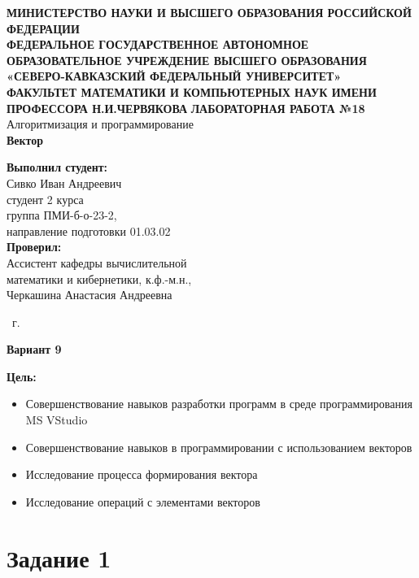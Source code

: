 \documentclass[14pt,a4paper]{article}
\begin{document}
\begin{titlepage}
  \begin{center}
    {\large\scshape\bfseries
    МИНИСТЕРСТВО НАУКИ И ВЫСШЕГО ОБРАЗОВАНИЯ РОССИЙСКОЙ ФЕДЕРАЦИИ\\
    ФЕДЕРАЛЬНОЕ ГОСУДАРСТВЕННОЕ АВТОНОМНОЕ ОБРАЗОВАТЕЛЬНОЕ УЧРЕЖДЕНИЕ ВЫСШЕГО
    ОБРАЗОВАНИЯ\\
    «СЕВЕРО-КАВКАЗСКИЙ ФЕДЕРАЛЬНЫЙ УНИВЕРСИТЕТ»\\
    ФАКУЛЬТЕТ МАТЕМАТИКИ И КОМПЬЮТЕРНЫХ НАУК ИМЕНИ ПРОФЕССОРА Н.И.ЧЕРВЯКОВА}
    \vfill
    \Large{\textbf{ЛАБОРАТОРНАЯ РАБОТА №18}}\\[2mm]
    \large{Алгоритмизация и программирование}\\[6mm]
    \large{\textbf{Вектор}}\\[20mm]
  \end{center}
  \begin{flushright}
    \large{
      \textbf{Выполнил студент:}\\
      Сивко Иван Андреевич\\
      студент 2 курса\\
      группа ПМИ-б-о-23-2,\\
      направление подготовки 01.03.02\\[5mm]
      \textbf{Проверил:}\\
      Ассистент кафедры вычислительной\\
      математики и кибернетики, к.ф.-м.н.,\\
      Черкашина Анастасия Андреевна}
  \end{flushright}
  \vfill
  \centerline{ \the\year\ г. }
\end{titlepage}

\centerline{\large\textbf{Вариант 9}}
\large{\textbf{Цель:}}
\begin{small}
  \begin{itemize}
    \item Совершенствование навыков разработки программ в среде
      программирования MS VStudio
    \item Совершенствование навыков в программировании с использованием векторов
    \item Исследование процесса формирования вектора
    \item Исследование операций с элементами векторов
  \end{itemize}
\end{small}
\section*{Задание 1}
\end{document}
